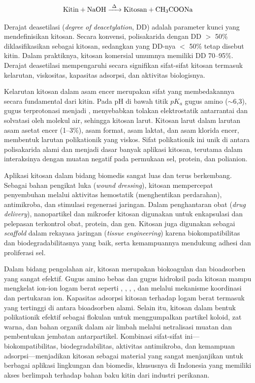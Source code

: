 \documentclass[12pt,a4paper,openany]{book}
\begin{document}
\begin{equation}
\ce{Kitin + NaOH ->[\Delta] Kitosan + CH3COONa}
\end{equation}

Derajat deasetilasi (\textit{degree of deacetylation}, DD) adalah parameter kunci yang mendefinisikan kitosan. Secara konvensi, polisakarida dengan DD $>$ 50\% diklasifikasikan sebagai kitosan, sedangkan yang DD-nya $<$ 50\% tetap disebut kitin. Dalam praktiknya, kitosan komersial umumnya memiliki DD 70--95\%. Derajat deasetilasi mempengaruhi secara signifikan sifat-sifat kitosan termasuk kelarutan, viskositas, kapasitas adsorpsi, dan aktivitas biologisnya.

Kelarutan kitosan dalam asam encer merupakan sifat yang membedakannya secara fundamental dari kitin. Pada pH di bawah titik $pK_a$ gugus amino ($\sim$6,3), gugus  terprotonasi menjadi , menyebabkan tolakan elektrostatik antarrantai dan solvatasi oleh molekul air, sehingga kitosan larut. Kitosan larut dalam larutan asam asetat encer (1--3\%), asam format, asam laktat, dan asam klorida encer, membentuk larutan polikationik yang viskos. Sifat polikationik ini unik di antara polisakarida alami dan menjadi dasar banyak aplikasi kitosan, terutama dalam interaksinya dengan muatan negatif pada permukaan sel, protein, dan polianion.

Aplikasi kitosan dalam bidang biomedis sangat luas dan terus berkembang. Sebagai bahan pengikat luka (\textit{wound dressing}), kitosan mempercepat penyembuhan melalui aktivitas hemostatik (menghentikan perdarahan), antimikroba, dan stimulasi regenerasi jaringan. Dalam penghantaran obat (\textit{drug delivery}), nanopartikel dan mikrosfer kitosan digunakan untuk enkapsulasi dan pelepasan terkontrol obat, protein, dan gen. Kitosan juga digunakan sebagai \textit{scaffold} dalam rekayasa jaringan (\textit{tissue engineering}) karena biokompatibilitas dan biodegradabilitasnya yang baik, serta kemampuannya mendukung adhesi dan proliferasi sel.

Dalam bidang pengolahan air, kitosan merupakan biokoagulan dan bioadsorben yang sangat efektif. Gugus amino bebas dan gugus hidroksil pada kitosan mampu mengkelat ion-ion logam berat seperti , , , , dan  melalui mekanisme koordinasi dan pertukaran ion. Kapasitas adsorpsi kitosan terhadap logam berat termasuk yang tertinggi di antara bioadsorben alami. Selain itu, kitosan dalam bentuk polikationik efektif sebagai flokulan untuk menggumpalkan partikel koloid, zat warna, dan bahan organik dalam air limbah melalui netralisasi muatan dan pembentukan jembatan antarpartikel. Kombinasi sifat-sifat ini---biokompatibilitas, biodegradabilitas, aktivitas antimikroba, dan kemampuan adsorpsi---menjadikan kitosan sebagai material yang sangat menjanjikan untuk berbagai aplikasi lingkungan dan biomedis, khususnya di Indonesia yang memiliki akses berlimpah terhadap bahan baku kitin dari industri perikanan.
\end{document}
